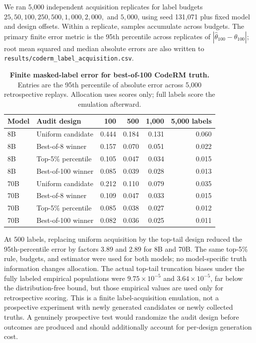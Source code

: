 \documentclass[10pt,twocolumn]{article}
\begin{document}
We ran 5,000 independent acquisition replicates for label budgets $25,50,100,250,500,1{,}000,2{,}000,$ and $5{,}000$, using seed 131,071 plus fixed model and design offsets. Within a replicate, samples accumulate across budgets. The primary finite error metric is the 95th percentile across replicates of $|\widehat\theta_{100}-\theta_{100}|$; root mean squared and median absolute errors are also written to \texttt{results/coderm\_label\_acquisition.csv}.

\begin{table}[h]
\centering
\caption{\textbf{Finite masked-label error for best-of-100 CodeRM truth.} Entries are the 95th percentile of absolute error across 5,000 retrospective replays. Allocation uses scores only; full labels score the emulation afterward.}
\label{si:tab:finite-label-acquisition}
\begin{tabular}{llrrrr}
\toprule
Model & Audit design & 100 & 500 & 1,000 & 5,000 labels \\
\midrule
8B & Uniform candidate & 0.444 & 0.184 & 0.131 & 0.060 \\
8B & Best-of-8 winner & 0.157 & 0.070 & 0.051 & 0.022 \\
8B & Top-5\% percentile & 0.105 & 0.047 & 0.034 & 0.015 \\
8B & Best-of-100 winner & 0.085 & 0.039 & 0.028 & 0.013 \\
70B & Uniform candidate & 0.212 & 0.110 & 0.079 & 0.035 \\
70B & Best-of-8 winner & 0.109 & 0.047 & 0.033 & 0.015 \\
70B & Top-5\% percentile & 0.085 & 0.038 & 0.027 & 0.012 \\
70B & Best-of-100 winner & 0.082 & 0.036 & 0.025 & 0.011 \\
\bottomrule
\end{tabular}
\end{table}

At 500 labels, replacing uniform acquisition by the top-tail design reduced the 95th-percentile error by factors 3.89 and 2.89 for 8B and 70B. The same top-5\% rule, budgets, and estimator were used for both models; no model-specific truth information changes allocation. The actual top-tail truncation biases under the fully labeled empirical populations were $9.75\times10^{-5}$ and $3.64\times10^{-5}$, far below the distribution-free bound, but those empirical values are used only for retrospective scoring. This is a finite label-acquisition emulation, not a prospective experiment with newly generated candidates or newly collected truths. A genuinely prospective test would randomize the audit design before outcomes are produced and should additionally account for per-design generation cost.
\end{document}
